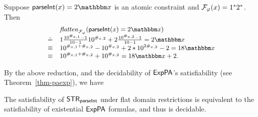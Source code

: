 \begin{example}
Suppose $\parseInt(\svarx) = 2\ivarx$ is an atomic constraint and $\mathcal{F}_\varphi(x) = 1^*2^*$. Then 
\[
\small
\begin{array}{l l}
& \flatten_{\flatfun_\varphi}(\parseInt(\svarx)  =  2\ivarx)  \\
\Def & 1 \frac{10^{\#_{\svarx,1}}-1}{10-1}10^{\#_{\svarx,2}}  + 2 \frac{10^{\#_{\svarx,2}}-1}{10-1} = 2\ivarx   \\
\equiv & 10^{\#_{\svarx,1}+\#_{\svarx,2}} - 10^{\#_{\svarx,2}}  + 2*10^{2\#_{\svarx,2}}- 2 = 18\ivarx \\
\equiv & 10^{\#_{\svarx,1}+\#_{\svarx,2}} +  10^{\#_{\svarx,2}} = 18\ivarx + 2.
\end{array}
\]
\end{example}

By the above reduction, and the decidability of ${\sf ExpPA}$'s satisfiability (see Theorem~\ref{thm-paexp}), we have 
\begin{theorem} \label{thm:string-parInt}
    The satisfiability of  ${\sf STR}_{\textsf{parseInt}}$ under flat domain restrictions is equivalent to the satisfiability of existential ${\sf ExpPA}$ formulas, and thus is decidable.
\end{theorem}
